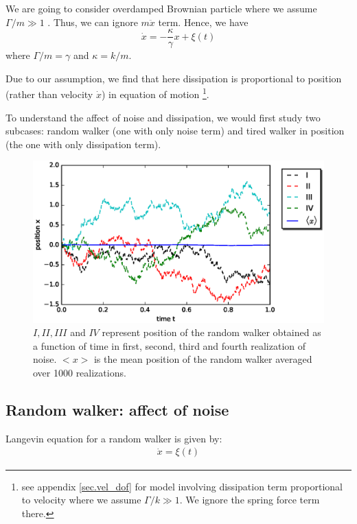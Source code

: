 \documentclass[11pt,a4paper]{article}
\begin{document}
We are going to consider overdamped Brownian particle where we assume $\Gamma / m \gg 1$ . Thus, we can ignore $m \ddot{x}$ term. Hence, we have 
\begin{equation}
  \dot{x}= -\dfrac{\kappa}{\gamma} x + \xi(t)
\end{equation}
where $\Gamma/m=\gamma$  and $\kappa =k/m$.

Due to our assumption, we find that here dissipation is proportional to position (rather than velocity $\dot{x}$) in equation of motion \footnote{see appendix \ref{sec.vel_dof} for model involving dissipation term proportional to velocity where we assume $\Gamma / k \gg 1$. We ignore the spring force term there.}. 

To understand the affect of noise and dissipation, we would first study two subcases: random walker (one with only noise term) and tired walker in position (the one with only dissipation term). 



\begin{figure}[!htbp]
\centering
\includegraphics[scale=0.67]{x_mean.eps}
\caption{$I, II, III$ and $IV$ represent position of the random walker obtained as a function of time in first, second, third and fourth realization of noise. $<x>$ is the mean position of the random walker averaged  over 1000 realizations.}
\label{meanx}
\end{figure}


\subsection*{Random walker: affect of noise}
Langevin equation for a random walker is given by:
\begin{eqnarray}
\dot{x}=  \xi(t)
\label{rand}
\end{eqnarray}
\end{document}
